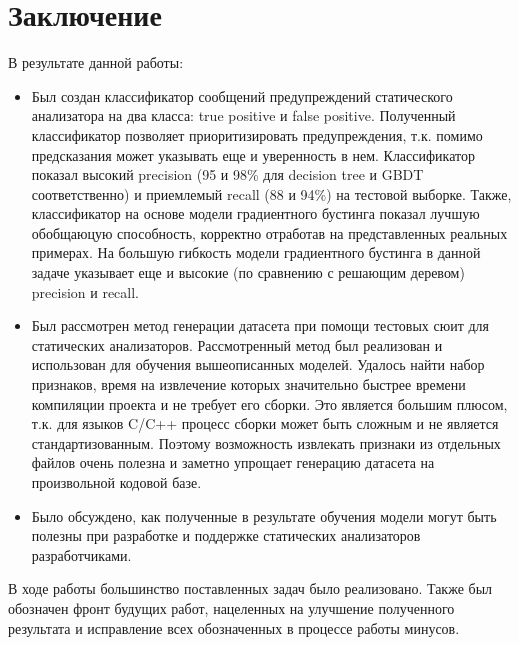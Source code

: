 \section{Заключение}
\label{sec:Chapter5} 

В результате данной работы:
\begin{itemize}
    \item Был создан классификатор сообщений предупреждений статического анализатора на два класса: true positive и false positive. Полученный классификатор позволяет приоритизировать предупреждения, т.к. помимо предсказания может указывать еще и уверенность в нем. Классификатор показал высокий precision (95 и 98\% для decision tree и GBDT соответственно) и приемлемый recall (88 и 94\%) на тестовой выборке. Также, классификатор на основе модели градиентного бустинга показал лучшую обобщаюцую способность, корректно отработав на представленных реальных примерах. На большую гибкость модели градиентного бустинга в данной задаче указывает еще и высокие (по сравнению с решающим деревом) precision и recall.
    \item Был рассмотрен метод генерации датасета при помощи тестовых сюит для статических анализаторов. Рассмотренный метод был реализован и использован для обучения вышеописанных моделей. Удалось найти набор признаков, время на извлечение которых значительно быстрее времени компиляции проекта и не требует его сборки. Это является большим плюсом, т.к. для языков C/C++ процесс сборки может быть сложным и не является стандартизованным. Поэтому возможность извлекать признаки из отдельных файлов очень полезна и заметно упрощает генерацию датасета на произвольной кодовой базе.
    \item Было обсуждено, как полученные в результате обучения модели могут быть полезны при разработке и поддержке статических анализаторов разработчиками.
\end{itemize}

В ходе работы большинство поставленных задач было реализовано. Также был обозначен фронт будущих работ, нацеленных на улучшение полученного результата и исправление всех обозначенных в процессе работы минусов.

\newpage